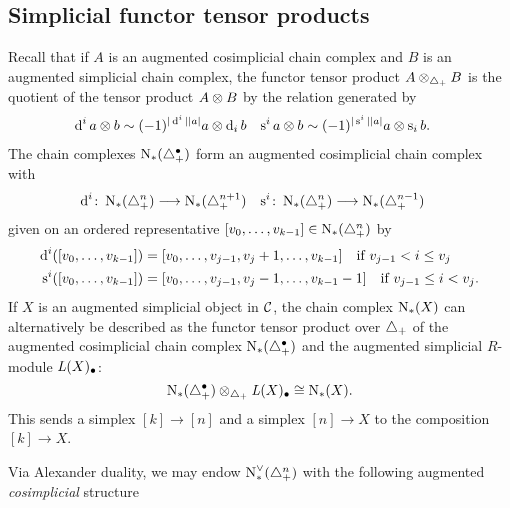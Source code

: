

\subsection{Simplicial functor tensor products}
Recall that if $A$ is an augmented cosimplicial chain complex and $B$ is an augmented simplicial chain complex, the functor tensor product $A \otimes _{\triangle_{+}} B$ is the quotient of the tensor product $A \otimes  B$ by the relation generated by
\begin{align*}
	\operatorname{d}^i a \otimes  b &\sim (-1)^{|\operatorname{d}^i||a|}a \otimes  \operatorname{d}_i b
	&
	\operatorname{s}^ia \otimes  b &\sim (-1)^{|\operatorname{s}^i||a|}a \otimes  \operatorname{s}_ib.
\end{align*}
The chain complexes $\operatorname{N}_{*}(\triangle_{+}^\bullet)$ form an augmented cosimplicial chain complex with
\begin{align*}
	\operatorname{d}^i \colon  \operatorname{N}_{*}(\triangle_{+}^n)&\longrightarrow \operatorname{N}_{*}(\triangle_{+}^{n+1})
	&
	\operatorname{s}^i \colon  \operatorname{N}_{*}(\triangle_{+}^{n})&\longrightarrow \operatorname{N}_{*}(\triangle_{+}^{n-1})
\end{align*}
given on an ordered representative $[v_0,\ldots,v_{k-1}]\in \operatorname{N}_{*}(\triangle_{+}^n)$ by
\begin{align*}
\operatorname{d}^i([v_0,\ldots,v_{k-1}]) &= [v_0,\ldots,v_{j-1},v_j+1,\ldots,v_{k-1}] \quad \text{if $v_{j-1}<i\leq v_j$}
\\
\operatorname{s}^i([v_0,\ldots,v_{k-1}]) &= [v_0,\ldots,v_{j-1},v_j-1,\ldots,v_{k-1}-1] \quad \text{if $v_{j-1} \leq i < v_j$}.
\end{align*}
If $X$ is an augmented simplicial object in $\mathcal{C}$, the chain complex $\operatorname{N}_{*}(X)$ can alternatively be described as the functor tensor product over $\triangle_{+}$ of the augmented cosimplicial chain complex $\operatorname{N}_{*}(\triangle_{+}^{\bullet})$ and the augmented simplicial $R$-module $\operatorname{{\it L}}(X)_\bullet$:
\begin{equation}\label{eq:1}
	\operatorname{N}_{*}(\triangle_{+}^\bullet) \otimes _{\triangle_{+}} \operatorname{{\it L}}(X)_\bullet \cong \operatorname{N}_{*}(X).
\end{equation}
This sends a simplex $[k]\to [n]$ and a simplex $[n]\to X$ to the composition $[k]\to X$.

Via Alexander duality, we may endow $\operatorname{N}^\vee_{*}(\triangle_{+}^n)$ with the following augmented \emph{cosimplicial} structure


